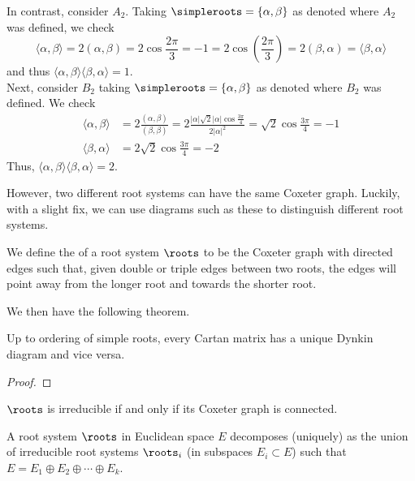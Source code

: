 \documentclass[11pt,leqno,oneside]{amsart}
\numberwithin{thm}{section}
\begin{document}
\begin{example}
  In contrast, consider \(A_2\). Taking \(\simpleroots = \{\alpha,
  \beta\}\) as denoted 
  where \(A_2\) was defined, we check \[
    \langle \alpha, \beta \rangle  = 2(\alpha,\beta) = 2 \cos
    \frac{2\pi}{3} = -1 = 2 \cos(\frac{2\pi}{3}) = 2(\beta,\alpha) =
    \langle \beta, \alpha \rangle
  \]
  and thus \(\langle \alpha,\beta \rangle \langle \beta,\alpha \rangle
  = 1\). \\

  Next, consider \(B_2\) taking \(\simpleroots = \{\alpha,\beta\}\) as
  denoted where \(B_2\) was defined. We check
  \begin{align*}
    \langle \alpha,\beta \rangle
    & = 2\frac{(\alpha,\beta)}{(\beta,\beta)} = 2
      \frac{|\alpha|\sqrt{2}|\alpha| \cos \frac{3\pi}{4}}{2|\alpha|^2}
      = \sqrt{2} \cos \frac{3\pi}{4} = -1 \\
    \langle \beta,\alpha \rangle
    & = 2 \sqrt{2} \cos \frac{3\pi}{4} = -2
  \end{align*}
  Thus, \(\langle \alpha,\beta \rangle \langle \beta,\alpha \rangle =
  2\). 
\end{example}
However, two different root systems can have the same Coxeter
graph. Luckily, with a slight fix, we can use diagrams such as these
to distinguish different root systems.
\begin{defn}
  We define the  of a root system \(\roots\) to be
  the Coxeter graph with directed edges such that, given double or
  triple edges between two roots, the edges will
  point away from the longer root and towards the shorter root.
\end{defn}
We then have the following theorem.
\begin{thm}
  Up to ordering of simple roots, every Cartan matrix has a unique
  Dynkin diagram and vice versa.
\end{thm}
\begin{proof}
\end{proof}
\begin{thm}
  \(\roots\) is irreducible if and only if its Coxeter graph is
  connected. 
\end{thm}
\begin{cor}
  A root system \(\roots\) in Euclidean space \(E\) decomposes
  (uniquely) as the union of 
  irreducible root systems \(\roots_i\) (in subspaces \(E_i \subset
  E\)) such that \(E = E_1 \oplus E_2 \oplus \cdots \oplus E_k\).
\end{cor}
\end{document}
